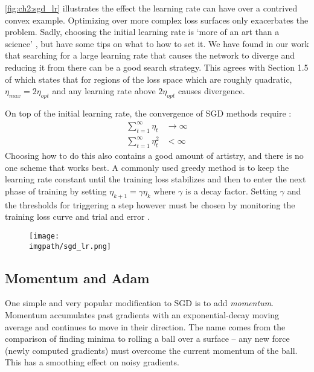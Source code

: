 \autoref{fig:ch2:sgd_lr} illustrates the effect the learning rate can have over
a contrived convex example. Optimizing over more complex loss surfaces only
exacerbates the problem. Sadly, choosing the initial learning rate is
`more of an art than a science' \cite{goodfellow_deep_2016}, but
\cite{bottou_stochastic_2012-1, montavon_neural_2012} have some tips on what to
how to set it. We have found in our work that searching for a large learning
rate that causes the network to diverge and reducing it from there can be a good
search strategy. This agrees with Section 1.5 of \cite{lecun_efficient_2012}
which states that for regions of the loss space which are roughly quadratic,
$\eta_{max} = 2\eta_{opt}$ and any learning rate above $2\eta_{opt}$ causes
divergence.

On top of the initial learning rate, the convergence of SGD methods require
\cite{bottou_stochastic_2012-1}:
\begin{align}
  \sum_{t=1}^{\infty} \eta_t &\rightarrow \infty \\
  \sum_{t=1}^{\infty} \eta_t^2 &< \infty
\end{align}
Choosing how to do this also contains a good amount of artistry,
and there is no one scheme that works best. A commonly used greedy method is to
keep the learning rate constant until the training loss stabilizes and then to
enter the next phase of training by setting $\eta_{k+1} = \gamma \eta_{k}$ where
$\gamma$ is a decay factor. Setting $\gamma$ and the thresholds for triggering
a step however must be chosen by monitoring the training loss curve and trial
and error \cite{bottou_stochastic_2012-1}.

\begin{figure}[t]
  \centering
  \texttt{[image: \\imgpath/sgd\_lr.png]}
  \label{fig:ch2:sgd_lr}
\end{figure}

\subsection{Momentum and Adam}
One simple and very popular modification to SGD is to add \emph{momentum}.
Momentum accumulates past gradients with an exponential-decay moving average and
continues to move in their direction. The name comes from the comparison of finding
minima to rolling a ball over a surface --
any new force (newly computed gradients) must overcome the current momentum of
the ball. This has a smoothing effect on noisy gradients.

